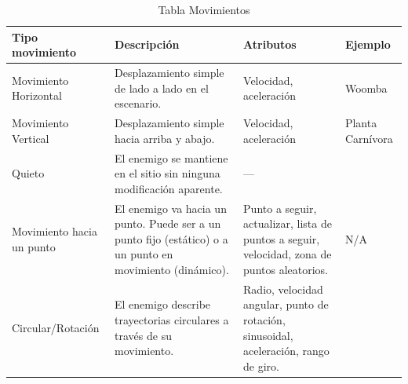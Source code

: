 \begin{table}[t]
	\centering
	\begin{tabular}{|p{3cm}|p{4.5cm}|p{4cm}|p{3cm}|}
	\hline
	\textbf{Tipo movimiento} & \textbf{Descripción} & \textbf{Atributos} & \textbf{Ejemplo} \\ 
	\hline
	Movimiento Horizontal & Desplazamiento simple de lado a lado en el escenario. & Velocidad, aceleración & Woomba \\ 
	\hline
	Movimiento Vertical & Desplazamiento simple hacia arriba y abajo. & Velocidad, aceleración & Planta Carnívora \\ 
	\hline
	Quieto & El enemigo se mantiene en el sitio sin ninguna modificación aparente. & —  \\ 
	\hline
	Movimiento hacia un punto & El enemigo va hacia un punto. Puede ser a un punto fijo (estático) o a un punto en movimiento (dinámico). & Punto a seguir, actualizar, lista de puntos a seguir, velocidad, zona de puntos aleatorios. & N/A \\ 
	\hline
	Circular/Rotación & El enemigo describe trayectorias circulares a través de su movimiento. & Radio, velocidad angular, punto de rotación, sinusoidal, aceleración, rango de giro.  \\ 
	\hline
	\end{tabular}
	\caption{Tabla Movimientos}
	\label{tab:movimientos}
\end{table}

\begin{table}[t]
    \centering

    \renewcommand{\arraystretch}{1.5}
    \setlength{\tabcolsep}{4pt} %
    \caption{Matriz de compatibilidad de movimientos}
\end{table}


